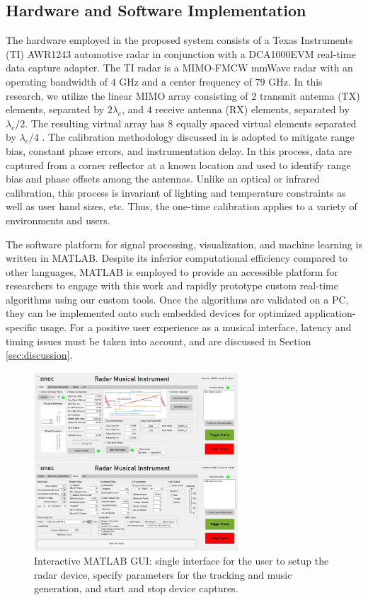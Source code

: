 \documentclass[10pt,journal,final]{IEEEtran}
\begin{document}
\subsection{Hardware and Software Implementation}
\label{subsec:hardware_setup_and_challenges}
The hardware employed in the proposed system consists of a Texas Instruments (TI) AWR1243 automotive radar in conjunction with a DCA1000EVM real-time data capture adapter. 
The TI radar is a MIMO-FMCW mmWave radar with an operating bandwidth of $4$ GHz and a center frequency of $79$ GHz. 
In this research, we utilize the linear MIMO array consisting of $2$ transmit antenna (TX) elements, separated by $2\lambda_c$, and $4$ receive antenna (RX) elements, separated by $\lambda_c/2$.
The resulting virtual array has 8 equally spaced virtual elements separated by $\lambda_c/4$ \cite{ti:intro_to_FMCW_radars}. 
The calibration methodology discussed in \cite{muhammet:testbeds} is adopted to mitigate range bias, constant phase errors, and instrumentation delay. 
In this process, data are captured from a corner reflector at a known location and used to identify range bias and phase offsets among the antennas.
Unlike an optical or infrared calibration, this process is invariant of lighting and temperature constraints as well as user hand sizes, etc.
Thus, the one-time calibration applies to a variety of environments and users.

The software platform for signal processing, visualization, and machine learning is written in MATLAB. 
Despite its inferior computational efficiency compared to other languages, MATLAB is employed to provide an accessible platform for researchers to engage with this work and rapidly prototype custom real-time algorithms using our custom tools.
Once the algorithms are validated on a PC, they can be implemented onto such embedded devices for optimized application-specific usage.
For a positive user experience as a musical interface, latency and timing issues must be taken into account, and are discussed in Section \ref{sec:discussion}.


\begin{figure}[h]
	\centering
	\includegraphics[width=3in]{MATLAB_GUI_2.jpg}
	\caption{Interactive MATLAB GUI: single interface for the user to setup the radar device, specify parameters for the tracking and music generation, and start and stop device captures.}
	\label{fig:matlab_gui}
\end{figure}
\end{document}
